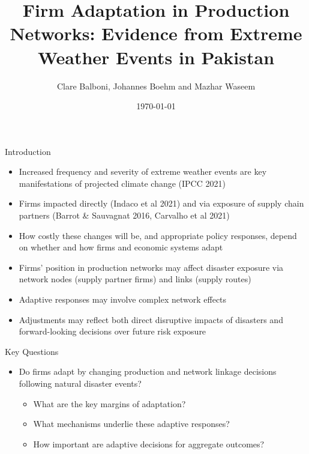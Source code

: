\documentclass{beamer}
\begin{document}
\title{Firm Adaptation in Production Networks: Evidence from Extreme Weather Events in Pakistan}
\author{Clare Balboni, Johannes Boehm and Mazhar Waseem}

\date{\today}

\frame{\titlepage}

\begin{frame}{Introduction}
\begin{itemize}
    \item Increased frequency and severity of extreme weather events are key
manifestations of projected climate change (IPCC 2021)
\item Firms impacted directly (Indaco et al 2021) and via exposure of supply
chain partners (Barrot \& Sauvagnat 2016, Carvalho et al 2021)
\item How costly these changes will be, and appropriate policy responses,
depend on whether and how firms and economic systems adapt
\item Firms' position in production networks may affect disaster exposure
via network nodes (supply partner firms) and links (supply routes)
\item Adaptive responses may involve complex network effects
\item Adjustments may reflect both direct disruptive impacts of disasters
and forward-looking decisions over future risk exposure
    
\end{itemize}

\end{frame}

\begin{frame}{Key Questions}
    \begin{itemize}
        \item Do firms adapt by changing production and network linkage
        decisions following natural disaster events?
        \begin{itemize}
            \item     What are the key margins of adaptation?
            \item What mechanisms underlie these adaptive responses?
            \item How important are adaptive decisions for aggregate outcomes?
        \end{itemize}
    
    \end{itemize}
\end{frame}
\end{document}

